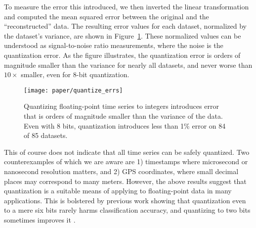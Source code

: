 To measure the error this introduced, we then inverted the linear transformation and computed the mean squared error between the original and the ``reconstructed'' data. The resulting error values for each dataset, normalized by the dataset's variance, are shown in Figure~\ref{fig:quantize_errs}. These normalized values can be understood as signal-to-noise ratio measurements, where the noise is the quantization error. As the figure illustrates, the quantization error is orders of magnitude smaller than the variance for nearly all datasets, and never worse than $10\times$ smaller, even for 8-bit quantization.

\begin{figure}[h]
\begin{center}
    \texttt{[image: paper/quantize\_errs]}
    \caption{Quantizing floating-point time series to integers introduces error that is orders of magnitude smaller than the variance of the data. Even with 8 bits, quantization introduces less than 1\% error on 84 of 85 datasets.}
    \label{fig:quantize_errs}

\end{center}
\end{figure}

This of course does not indicate that all time series can be safely quantized. Two counterexamples of which we are aware are 1) timestamps where microsecond or nanosecond resolution matters, and 2) GPS coordinates, where small decimal places may correspond to many meters. However, the above results suggest that quantization is a suitable means of applying \minesp to floating-point data in many applications. This is bolstered by previous work showing that quantization even to a mere six bits \cite{epenthesis} rarely harms classification accuracy, and quantizing to two bits sometimes improves it \cite{saxvsm}.



